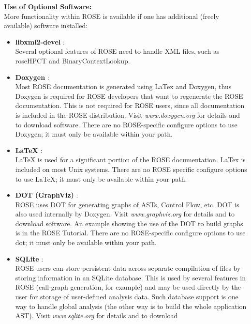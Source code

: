 {\bf Use of Optional Software:} \\
More functionality within ROSE is available if one has additional (freely available) software installed:
\begin{itemize}
   \item {\bf libxml2-devel }: \\
         Several optional features of ROSE need to handle XML files, such as
         roseHPCT and BinaryContextLookup.
   \item {\bf Doxygen} : \\
          Most ROSE documentation is generated using LaTex and Doxygen, thus
          Doxygen is required for ROSE developers that want to regenerate the ROSE
          documentation. This is not required for ROSE users, since all documentation is 
          included in the ROSE distribution. Visit {\it www.doxygen.org} for details and to
          download software.  There are no ROSE-specific configure options to use Doxygen;
          it must only be available within your path.
   \item {\bf LaTeX} : \\
          LaTeX is used for a significant portion of the ROSE documentation. LaTex is 
          included on most Unix systems. There are no ROSE specific configure options 
          to use LaTeX; it must only be available within your path.
   \item {\bf DOT (GraphViz)} : \\
          ROSE uses DOT for generating graphs of ASTs, Control Flow, etc.
          DOT is also used internally by Doxygen.
          Visit {\it www.graphviz.org} for details and to download software.
          An example showing the use of the DOT to build graphs is in the ROSE Tutorial.
          There are no ROSE-specific configure options to use dot; it must only be 
          available within your path.
   \item {\bf SQLite} : \\
          ROSE users can store persistent data across separate compilation of files by
          storing information in an SQLite database.  This is used by several features
          in ROSE (call-graph generation, for example) and may be used directly by the
          user for storage of user-defined analysis data.  Such database support is
          one way to handle global analysis (the other way is to build the whole
          application AST). Visit {\it www.sqlite.org} for details and to download

\end{itemize}
